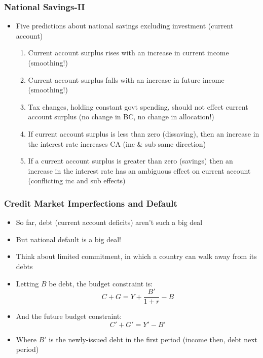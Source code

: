 \documentclass{beamer}
\begin{document}
\begin{frame}
\frametitle[alignment=center]{National Savings-II}
\begin{itemize}
\item Five predictions about national savings excluding investment (current account)
\bigskip
\begin{enumerate}
\item Current account surplus rises with an increase in current income (smoothing!)
\item Current account surplus falls with an increase in future income (smoothing!)
\item Tax changes, holding constant govt spending, should not effect current account surplus (no change in BC, no change in allocation!)
\item If current account surplus is less than zero (dissaving), then an increase in the interest rate increases CA (inc \& sub same direction)
\item If a current account surplus is greater than zero (savings) then an increase in the interest rate has an ambiguous effect on current account (conflicting inc and sub effects)
\end{enumerate}
\end{itemize}
\end{frame}




\begin{frame}
\frametitle[alignment=center]{Credit Market Imperfections and Default}
\begin{itemize}
\item So far, debt (current account deficits) aren't such a big deal
\bigskip
\item But national default is a big deal!
\bigskip
\item Think about limited commitment, in which a country can walk away from its debts
\bigskip
\item Letting $B$ be debt, the budget constraint is:
$$C+G=Y+\frac{B'}{1+r}-B$$
\item And the future budget constraint:
$$C'+G'=Y'-B'$$
\item Where $B'$ is the newly-issued debt in the first period (income then, debt next period)
\end{itemize}
\end{frame}
\end{document}
